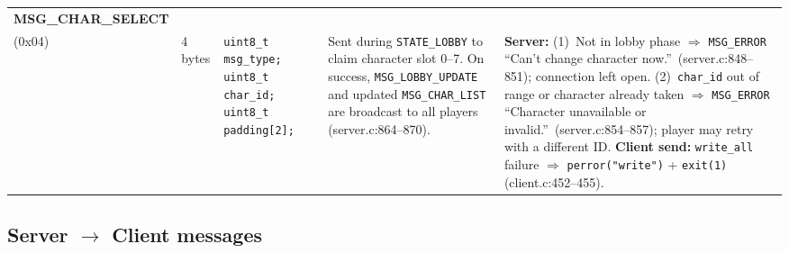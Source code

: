 \documentclass[11pt,letterpaper]{article}
\begin{document}
\begin{longtable}{@{}p{1.8cm} p{1.2cm} p{2.4cm} p{4.2cm} p{4.8cm}@{}}
\textbf{MSG\_CHAR\_SELECT}\\(0x04) &
4 bytes &
\texttt{uint8\_t msg\_type;}\newline
\texttt{uint8\_t char\_id;}\newline
\texttt{uint8\_t padding[2];} &
Sent during \texttt{STATE\_LOBBY} to claim character slot 0--7. On success, \texttt{MSG\_LOBBY\_UPDATE} and updated \texttt{MSG\_CHAR\_LIST} are broadcast to all players (server.c:864--870). &
\textbf{Server:} (1)~Not in lobby phase $\Rightarrow$ \texttt{MSG\_ERROR} ``Can't change character now.''\ (server.c:848--851); connection left open. (2)~\texttt{char\_id} out of range or character already taken $\Rightarrow$ \texttt{MSG\_ERROR} ``Character unavailable or invalid.''\ (server.c:854--857); player may retry with a different ID. \textbf{Client send:} \texttt{write\_all} failure $\Rightarrow$ \texttt{perror("write")} + \texttt{exit(1)} (client.c:452--455). \\
\bottomrule
\end{longtable}
\endgroup
\newpage

\subsection*{Server $\to$ Client messages}
\end{document}
